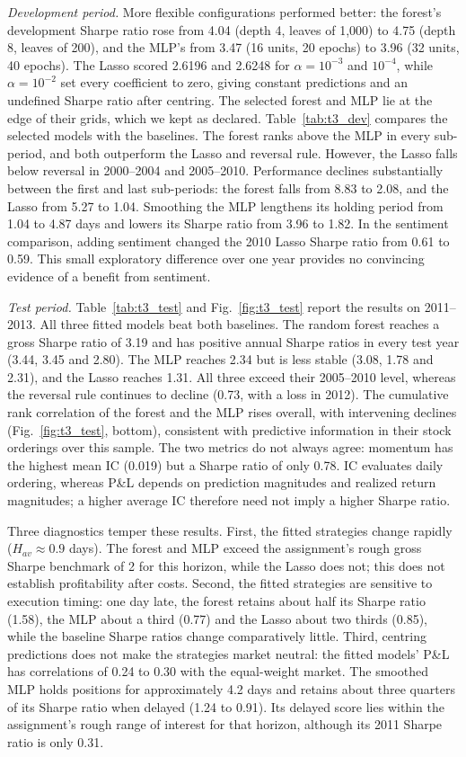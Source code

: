 \documentclass[conference]{IEEEtran}
\begin{document}
\textit{Development period.} More flexible configurations performed better: the forest's development Sharpe ratio rose from 4.04 (depth 4, leaves of 1,000) to 4.75 (depth 8, leaves of 200), and the MLP's from 3.47 (16 units, 20 epochs) to 3.96 (32 units, 40 epochs). The Lasso scored 2.6196 and 2.6248 for $\alpha=10^{-3}$ and $10^{-4}$, while $\alpha=10^{-2}$ set every coefficient to zero, giving constant predictions and an undefined Sharpe ratio after centring. The selected forest and MLP lie at the edge of their grids, which we kept as declared. Table~\ref{tab:t3_dev} compares the selected models with the baselines. The forest ranks above the MLP in every sub-period, and both outperform the Lasso and reversal rule. However, the Lasso falls below reversal in 2000--2004 and 2005--2010. Performance declines substantially between the first and last sub-periods: the forest falls from 8.83 to 2.08, and the Lasso from 5.27 to 1.04. Smoothing the MLP lengthens its holding period from 1.04 to 4.87 days and lowers its Sharpe ratio from 3.96 to 1.82. In the sentiment comparison, adding sentiment changed the 2010 Lasso Sharpe ratio from 0.61 to 0.59. This small exploratory difference over one year provides no convincing evidence of a benefit from sentiment.

\textit{Test period.} Table~\ref{tab:t3_test} and Fig.~\ref{fig:t3_test} report the results on 2011--2013. All three fitted models beat both baselines. The random forest reaches a gross Sharpe ratio of 3.19 and has positive annual Sharpe ratios in every test year (3.44, 3.45 and 2.80). The MLP reaches 2.34 but is less stable (3.08, 1.78 and 2.31), and the Lasso reaches 1.31. All three exceed their 2005--2010 level, whereas the reversal rule continues to decline (0.73, with a loss in 2012). The cumulative rank correlation of the forest and the MLP rises overall, with intervening declines (Fig.~\ref{fig:t3_test}, bottom), consistent with predictive information in their stock orderings over this sample. The two metrics do not always agree: momentum has the highest mean IC (0.019) but a Sharpe ratio of only 0.78. IC evaluates daily ordering, whereas P\&L depends on prediction magnitudes and realized return magnitudes; a higher average IC therefore need not imply a higher Sharpe ratio.

Three diagnostics temper these results. First, the fitted strategies change rapidly ($H_{av}\approx0.9$ days). The forest and MLP exceed the assignment's rough gross Sharpe benchmark of 2 for this horizon, while the Lasso does not; this does not establish profitability after costs. Second, the fitted strategies are sensitive to execution timing: one day late, the forest retains about half its Sharpe ratio (1.58), the MLP about a third (0.77) and the Lasso about two thirds (0.85), while the baseline Sharpe ratios change comparatively little. Third, centring predictions does not make the strategies market neutral: the fitted models' P\&L has correlations of 0.24 to 0.30 with the equal-weight market. The smoothed MLP holds positions for approximately 4.2 days and retains about three quarters of its Sharpe ratio when delayed (1.24 to 0.91). Its delayed score lies within the assignment's rough range of interest for that horizon, although its 2011 Sharpe ratio is only 0.31.
\end{document}
